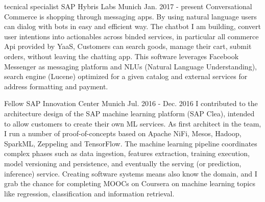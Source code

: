 

\begin{cventries}

  \cventry
    {tecnical specialist} %
    {SAP Hybris Labs} %
    {Munich} %
    {Jan. 2017 - present} %
    {
      Conversational Commerce is shopping through messaging apps. By using natural language users can dialog with bots in easy and efficient way.
      The chatbot I am building, convert user intentions into actionables across binded services, in particular all commerce Api provided by YaaS,
      Customers can search goods, manage their cart, submit orders, without leaving the chatting app.
      This software leverages Facebook Messenger as messaging platform and NLUs (Natural Language Understanding), search engine (Lucene)
      optimized for a given catalog and external services for address formatting and payment.
    }

  \cventry
    {Fellow} %
    {SAP Innovation Center} %
    {Munich} %
    {Jul. 2016 - Dec. 2016} %
    {
      I contributed to the architecture design of the SAP machine learning platform (SAP Clea), intended to allow customers to create their own ML services.
      As first architect in the team, I run a number of proof-of-concepts based on Apache NiFi, Mesos, Hadoop, SparkML,
      Zeppeling and TensorFlow. The machine learning pipeline coordinates complex phases such as data ingestion, features extraction, training execution,
      model versioning and persistence, and eventually the serving (or prediction, inference) service. Creating software systems means also know the domain,
      and I grab the chance for completing MOOCs on Coursera on machine learning topics like regression, classification and information retrieval.
    }


\end{cventries}
